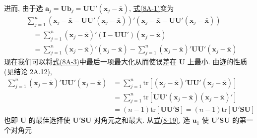 进而, 由于选 $\mathbf{a}_j=\mathbf{U}\mathbf{b}_j=\mathbf{U}\mathbf{U}'(\mathbf{x}_j-\bar{\mathbf{x}})$, \hyperref[eq:8A-1]{式(8A-1)}变为
\label{eq:8A-3}
\begin{equation}
\begin{aligned}
&\sum_{j=1}^{n}(\mathbf{x}_j-\bar{\mathbf{x}}-\mathbf{U}\mathbf{U}'(\mathbf{x}_j-\bar{\mathbf{x}}))'(\mathbf{x}_j-\bar{\mathbf{x}}-\mathbf{U}\mathbf{U}'(\mathbf{x}_j-\bar{\mathbf{x}}))\\
&\quad=\sum_{j=1}^{n}(\mathbf{x}_j-\bar{\mathbf{x}})'(\mathbf{I}-\mathbf{U}\mathbf{U}')(\mathbf{x}_j-\bar{\mathbf{x}})\\
&\quad=\sum_{j=1}^{n}(\mathbf{x}_j-\bar{\mathbf{x}})'(\mathbf{x}_j-\bar{\mathbf{x}})-\sum_{j=1}^{n}(\mathbf{x}_j-\bar{\mathbf{x}})'\mathbf{U}\mathbf{U}'(\mathbf{x}_j-\bar{\mathbf{x}})
\end{aligned}
\tag{8A-3}
\end{equation}
现在我们可以将\hyperref[eq:8A-3]{式(8A-3)}中最后一项最大化从而使误差在 $\mathbf{U}$ 上最小. 由迹的性质(见结论 2A.12),
\label{eq:8A-4}
\begin{equation}
\begin{aligned}
\sum_{j=1}^{n}(\mathbf{x}_j-\bar{\mathbf{x}})'\mathbf{U}\mathbf{U}'(\mathbf{x}_j-\bar{\mathbf{x}})&=\sum_{j=1}^{n}\mathrm{tr}[(\mathbf{x}_j-\bar{\mathbf{x}})'\mathbf{U}\mathbf{U}'(\mathbf{x}_j-\bar{\mathbf{x}})]\\
&=\sum_{j=1}^{n}\mathrm{tr}[\mathbf{U}\mathbf{U}'(\mathbf{x}_j-\bar{\mathbf{x}})(\mathbf{x}_j-\bar{\mathbf{x}})']\\
&=(n-1)\mathrm{tr}[\mathbf{U}\mathbf{U}'\mathbf{S}]=(n-1)\mathrm{tr}[\mathbf{U}'\mathbf{S}\mathbf{U}]
\end{aligned}
\tag{8A-4}
\end{equation}
也即 $\mathbf{U}$ 的最佳选择使 $\mathbf{U}'\mathbf{S}\mathbf{U}$ 对角元之和最大. 从\hyperref[eq:8-19]{式(8-19)}, 选 $\mathbf{u}_1$ 使 $\mathbf{U}'\mathbf{S}\mathbf{U}$ 的第一个对角元
